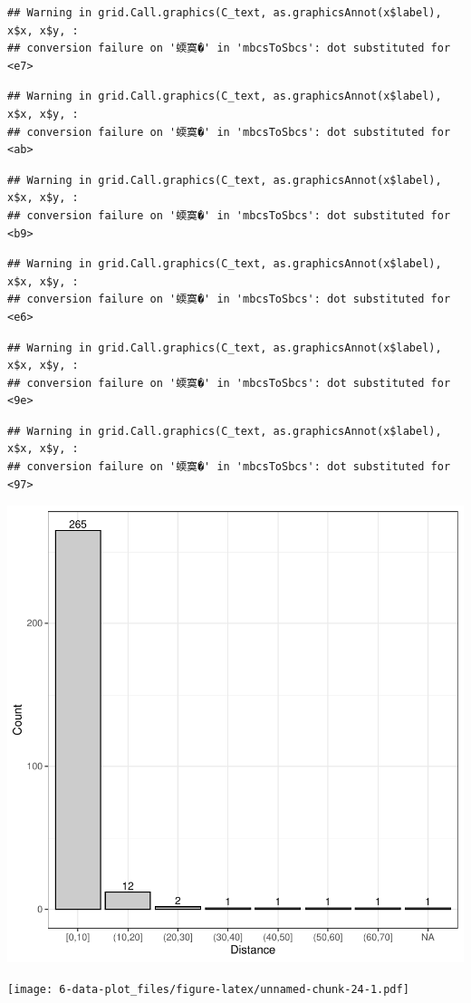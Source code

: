 \documentclass[
]{article}
\begin{document}
\begin{verbatim}
## Warning in grid.Call.graphics(C_text, as.graphicsAnnot(x$label), x$x, x$y, :
## conversion failure on '蝡寞�' in 'mbcsToSbcs': dot substituted for <e7>
\end{verbatim}

\begin{verbatim}
## Warning in grid.Call.graphics(C_text, as.graphicsAnnot(x$label), x$x, x$y, :
## conversion failure on '蝡寞�' in 'mbcsToSbcs': dot substituted for <ab>
\end{verbatim}

\begin{verbatim}
## Warning in grid.Call.graphics(C_text, as.graphicsAnnot(x$label), x$x, x$y, :
## conversion failure on '蝡寞�' in 'mbcsToSbcs': dot substituted for <b9>
\end{verbatim}

\begin{verbatim}
## Warning in grid.Call.graphics(C_text, as.graphicsAnnot(x$label), x$x, x$y, :
## conversion failure on '蝡寞�' in 'mbcsToSbcs': dot substituted for <e6>
\end{verbatim}

\begin{verbatim}
## Warning in grid.Call.graphics(C_text, as.graphicsAnnot(x$label), x$x, x$y, :
## conversion failure on '蝡寞�' in 'mbcsToSbcs': dot substituted for <9e>
\end{verbatim}

\begin{verbatim}
## Warning in grid.Call.graphics(C_text, as.graphicsAnnot(x$label), x$x, x$y, :
## conversion failure on '蝡寞�' in 'mbcsToSbcs': dot substituted for <97>
\end{verbatim}

\includegraphics{6-data-plot_files/figure-latex/unnamed-chunk-23-1.pdf}

\texttt{[image: 6-data-plot\_files/figure-latex/unnamed-chunk-24-1.pdf]}
\end{document}

